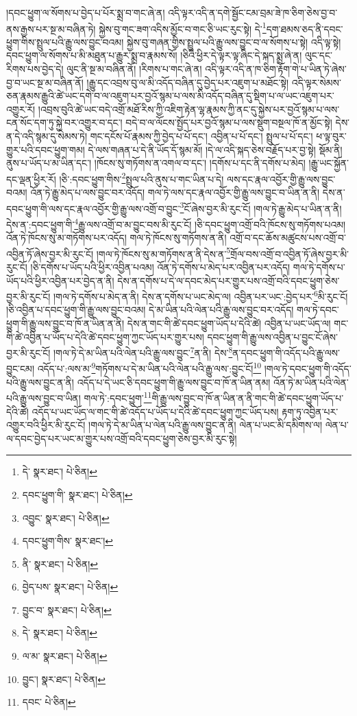 །དབང་ཕྱུག་ལ་སོགས་པ་བྱེད་པ་པོར་སྨྲ་བ་གང་ཞེ་ན། འདི་ལྟར་འདི་ན་དགེ་སྦྱོང་ངམ་བྲམ་ཟེ་ཁ་ཅིག་ཅེས་བྱ་བ་ནས་རྒྱས་པར་སྔ་མ་བཞིན་ཏེ། སྐྱེས་བུ་གང་ཟག་འདིས་མྱོང་བ་གང་ཅི་ཡང་རུང་སྟེ། དེ་\footnote{དེ་  སྣར་ཐང་།  པེ་ཅིན། }དག་ཐམས་ཅད་ནི་དབང་ཕྱུག་གིས་སྤྲུལ་པའི་རྒྱུ་ལས་བྱུང་བའམ། སྐྱེས་བུ་གཞན་གྱིས་སྤྲུལ་པའི་རྒྱུ་ལས་བྱུང་བ་ལ་སོགས་པ་སྟེ། འདི་ལྟ་སྟེ། དབང་ཕྱུག་ལ་སོགས་པ་མི་མཐུན་པ་རྒྱུར་སྨྲ་བ་རྣམས་སོ། །ཅིའི་ཕྱིར་དེ་ལྟར་ལྟ་ཞིང་དེ་སྐད་སྨྲ་ཞེ་ན། ལུང་དང་རིགས་པས་བྱེད་དེ། ལུང་ནི་སྔ་མ་བཞིན་ནོ། །རིགས་པ་གང་ཞེ་ན། འདི་ལྟར་འདི་ན་ཁ་ཅིག་རྟོག་གེ་པ་ཡིན་ཏེ་ཞེས་བྱ་བ་ཡང་སྔ་མ་བཞིན་ནོ། །རྒྱུ་དང་འབྲས་བུ་ལ་མི་འདོད་བཞིན་དུ་བྱེད་པར་འཇུག་པ་མཐོང་སྟེ། འདི་ལྟར་སེམས་ཅན་རྣམས་རྒྱུའི་ཚེ་ཡང་དགེ་བ་ལ་འཇུག་པར་བྱའོ་སྙམ་པ་ལས་མི་འདོད་བཞིན་དུ་སྡིག་པ་ལ་ཡང་འཇུག་པར་འགྱུར་རོ། །འབྲས་བུའི་ཚེ་ཡང་བདེ་འགྲོ་མཐོ་རིས་ཀྱི་འཇིག་རྟེན་ལྷ་རྣམས་ཀྱི་ནང་དུ་སྐྱེས་པར་བྱའོ་སྙམ་པ་ལས་ངན་སོང་དག་ཏུ་སྐྱེ་བར་འགྱུར་བ་དང་། བདེ་བ་ལ་ལོངས་སྤྱོད་པར་བྱའོ་སྙམ་པ་ལས་སྡུག་བསྔལ་ཁོ་ན་མྱོང་སྟེ། དེས་ན་དེ་འདི་སྙམ་དུ་སེམས་ཏེ། གང་དངོས་པོ་རྣམས་ཀྱི་བྱེད་པ་པོ་དང་། འབྱིན་པ་པོ་དང་། སྤྲུལ་པ་པོ་དང་། ཕ་ལྟ་བུར་གྱུར་པའི་དབང་ཕྱུག་གམ། དེ་ལས་གཞན་པ་དེ་ནི་ཡོད་དོ་སྙམ་མོ། །དེ་ལ་འདི་སྐད་ཅེས་བརྗོད་པར་བྱ་སྟེ། སྡོམ་ནི། ནུས་པ་ཡོད་པ་མ་ཡིན་དང་། །ཁོངས་སུ་གཏོགས་ན་འགལ་བ་དང་། །དགོས་པ་དང་ནི་དགོས་པ་མེད། །རྒྱུ་ཡང་སྐྱོན་དང་ལྡན་ཕྱིར་རོ། །ཅི་:དབང་ཕྱུག་གིས་\footnote{དབང་ཕྱུག་གི་  སྣར་ཐང་།  པེ་ཅིན། }སྤྲུལ་པའི་ནུས་པ་གང་ཡིན་པ་དེ། ལས་དང་རྣལ་འབྱོར་གྱི་རྒྱུ་ལས་བྱུང་བའམ། འོན་ཏེ་རྒྱུ་མེད་པ་ལས་བྱུང་བར་འདོད། གལ་ཏེ་ལས་དང་རྣལ་འབྱོར་གྱི་རྒྱུ་ལས་བྱུང་བ་ཡིན་ན་ནི། དེས་ན་དབང་ཕྱུག་གི་ལས་དང་རྣལ་འབྱོར་གྱི་རྒྱུ་ལས་འགྲོ་བ་བྱུང་\footnote{འབྱུང་  སྣར་ཐང་།  པེ་ཅིན། }ངོ་ཞེས་བྱར་མི་རུང་ངོ། །གལ་ཏེ་རྒྱུ་མེད་པ་ཡིན་ན་ནི། དེས་ན་:དབང་ཕྱུག་གི་\footnote{དབང་ཕྱུག་གིས་  སྣར་ཐང་། }རྒྱུ་ལས་འགྲོ་བ་མ་བྱུང་བས་མི་རུང་ངོ། །ཅི་དབང་ཕྱུག་འགྲོ་བའི་ཁོངས་སུ་གཏོགས་པའམ། འོན་ཏེ་ཁོངས་སུ་མ་གཏོགས་པར་འདོད། གལ་ཏེ་ཁོངས་སུ་གཏོགས་ན་ནི། འགྲོ་བ་དང་ཆོས་མཚུངས་པས་འགྲོ་བ་འབྱིན་ཏོ་ཞེས་བྱར་མི་རུང་ངོ། །གལ་ཏེ་ཁོངས་སུ་མ་གཏོགས་ན་ནི་དེས་ན་\footnote{ནི་  སྣར་ཐང་།  པེ་ཅིན། }གྲོལ་བས་འགྲོ་བ་འབྱིན་ཏོ་ཞེས་བྱར་མི་རུང་ངོ། །ཅི་དགོས་པ་ཡོད་པའི་ཕྱིར་འབྱིན་པའམ། འོན་ཏེ་དགོས་པ་མེད་པར་འབྱིན་པར་འདོད། གལ་ཏེ་དགོས་པ་ཡོད་པའི་ཕྱིར་འབྱིན་པར་བྱེད་ན་ནི། དེས་ན་དགོས་པ་དེ་ལ་དབང་མེད་པར་གྱུར་པས་འགྲོ་བའི་དབང་ཕྱུག་ཅེས་བྱར་མི་རུང་ངོ། །གལ་ཏེ་དགོས་པ་མེད་ན་ནི། དེས་ན་དགོས་པ་ཡང་མེད་ལ། འབྱིན་པར་ཡང་:བྱེད་པར་\footnote{བྱེད་པས་  སྣར་ཐང་།  པེ་ཅིན། }མི་རུང་ངོ། །ཅི་འབྱིན་པ་དབང་ཕྱུག་གི་རྒྱུ་ལས་བྱུང་བའམ། དེ་མ་ཡིན་པའི་ལེན་པའི་རྒྱུ་ལས་བྱུང་བར་འདོད། གལ་ཏེ་དབང་ཕྱུག་གི་རྒྱུ་ལས་བྱུང་བ་ཁོ་ན་ཡིན་ན་ནི། དེས་ན་གང་གི་ཚེ་དབང་ཕྱུག་ཡོད་པ་དེའི་ཚེ། འབྱིན་པ་ཡང་ཡོད་ལ། གང་གི་ཚེ་འབྱིན་པ་ཡོད་པ་དེའི་ཚེ་དབང་ཕྱུག་ཀྱང་ཡོད་པར་གྱུར་པས། དབང་ཕྱུག་གི་རྒྱུ་ལས་འབྱིན་པ་བྱུང་ངོ་ཞེས་བྱར་མི་རུང་ངོ། །གལ་ཏེ་དེ་མ་ཡིན་པའི་ལེན་པའི་རྒྱུ་ལས་བྱུང་\footnote{བྱུང་བ་  སྣར་ཐང་།  པེ་ཅིན། }ན་ནི། དེས་\footnote{དེ་  སྣར་ཐང་།  པེ་ཅིན། }ན་དབང་ཕྱུག་གི་འདོད་པའི་རྒྱུ་ལས་བྱུང་ངམ། འདོད་པ་:ལས་མ་\footnote{ལ་མ་  སྣར་ཐང་།  པེ་ཅིན། }གཏོགས་པ་དེ་མ་ཡིན་པའི་ལེན་པའི་རྒྱུ་ལས་:བྱུང་ངོ།\footnote{བྱུང་།  སྣར་ཐང་།  པེ་ཅིན། } །གལ་ཏེ་དབང་ཕྱུག་གི་འདོད་པའི་རྒྱུ་ལས་བྱུང་ན་ནི། འདོད་པ་དེ་ཡང་ཅི་དབང་ཕྱུག་གི་རྒྱུ་ལས་བྱུང་བ་ཁོ་ན་ཡིན་ནམ། འོན་ཏེ་མ་ཡིན་པའི་ལེན་པའི་རྒྱུ་ལས་བྱུང་བ་ཡིན། གལ་ཏེ་:དབང་ཕྱུག་\footnote{དབང་  པེ་ཅིན། }གི་རྒྱུ་ལས་བྱུང་བ་ཁོ་ན་ཡིན་ན་ནི་གང་གི་ཚེ་དབང་ཕྱུག་ཡོད་པ་དེའི་ཚེ། འདོད་པ་ཡང་ཡོད་ལ་གང་གི་ཚེ་འདོད་པ་ཡོད་པ་དེའི་ཚེ་དབང་ཕྱུག་ཀྱང་ཡོད་པས། རྟག་ཏུ་འབྱིན་པར་འགྱུར་བའི་ཕྱིར་མི་རུང་ངོ། །གལ་ཏེ་དེ་མ་ཡིན་པ་ལེན་པའི་རྒྱུ་ལས་བྱུང་ན་ནི། ལེན་པ་ཡང་མི་དམིགས་ལ། ལེན་པ་ལ་དབང་བྱེད་པར་ཡང་མ་གྱུར་པས་འགྲོ་བའི་དབང་ཕྱུག་ཅེས་བྱར་མི་རུང་སྟེ། 